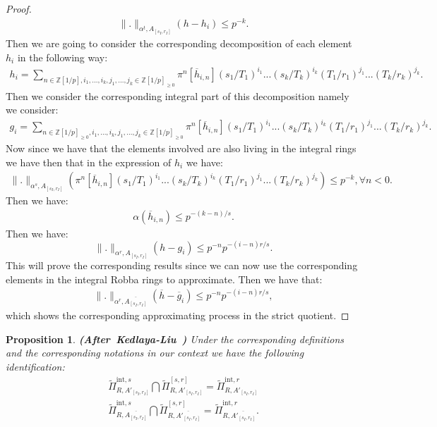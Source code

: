 \documentclass[12pt]{amsart}
\newtheorem{proposition}[theorem]{Proposition}
\theoremstyle{definition}
\numberwithin{equation}{section}
\begin{document}
\begin{proof}
\begin{align}
\|.\|_{\alpha^t,A_{[s_I,r_I]}}(h-h_i)\leq p^{-k}.	
\end{align}
Then we are going to consider the corresponding decomposition of each element $h_i$ in the following way:
\begin{align}
h_i=\sum_{n\in \mathbb{Z}[1/p],i_1,...,i_k,j_1,...,j_k\in \mathbb{Z}[1/p]_{\geq 0}}\pi^n[\overline{h}_{i,n}](s_1/T_1)^{i_1}...(s_k/T_k)^{i_k}(T_1/r_1)^{j_1}...(T_k/r_k)^{j_k}.	
\end{align}
Then we consider the corresponding integral part of this decomposition namely we consider:
\begin{align}
g_i=\sum_{n\in \mathbb{Z}[1/p]_{\geq 0},i_1,...,i_k,j_1,...,j_k\in \mathbb{Z}[1/p]_{\geq 0}}\pi^n[\overline{h}_{i,n}](s_1/T_1)^{i_1}...(s_k/T_k)^{i_k}(T_1/r_1)^{j_1}...(T_k/r_k)^{j_k}.	
\end{align}
Now since we have that the elements involved are also living in the integral rings we have then that in the expression of $h_i$ we have:
\begin{align}
\|.\|_{\alpha^s,A_{[s_I,r_I]}}(\pi^n[\overline{h}_{i,n}](s_1/T_1)^{i_1}...(s_k/T_k)^{i_k}(T_1/r_1)^{j_1}...(T_k/r_k)^{j_k})\leq p^{-k},\forall n<0.	
\end{align}
Then we have:
\begin{align}
{\alpha}(\overline{h}_{i,n})\leq p^{-(k-n)/s}.	
\end{align}
Then we have:
\begin{displaymath}
\|.\|_{\alpha^r,A_{[s_I,r_I]}}(h-g_i)\leq p^{-n}p^{-(i-n)r/s}.	
\end{displaymath}
This will prove the corresponding results since we can now use the corresponding elements in the integral Robba rings to approximate. Then we have that:
\begin{align}
\|.\|_{\alpha^r,\overline{A_{[s_I,r_I]}}}(\overline{h}-\overline{g}_i)\leq p^{-n}p^{-(i-n)r/s},	
\end{align}
which shows the corresponding approximating process in the strict quotient.

\end{proof}




\begin{proposition} \mbox{\bf{(After Kedlaya-Liu \cite[Lemma 5.2.6]{KL1})}} 
Under the corresponding definitions and the corresponding notations in our context we have the following identification:
\begin{align}
\widetilde{\Pi}^{\mathrm{int},s}_{R,A'_{[s_I,r_I]}}\bigcap \widetilde{\Pi}^{[s,r]}_{R,A'_{[s_I,r_I]}}=	\widetilde{\Pi}^{\mathrm{int},r}_{R,A'_{[s_I,r_I]}}\\
\widetilde{\Pi}^{\mathrm{int},s}_{R,\overline{A_{[s_I,r_I]}}}\bigcap \widetilde{\Pi}^{[s,r]}_{R,\overline{A'_{[s_I,r_I]}}}=	\widetilde{\Pi}^{\mathrm{int},r}_{R,\overline{A'_{[s_I,r_I]}}}.
\end{align}
	
\end{proposition}
\end{document}
